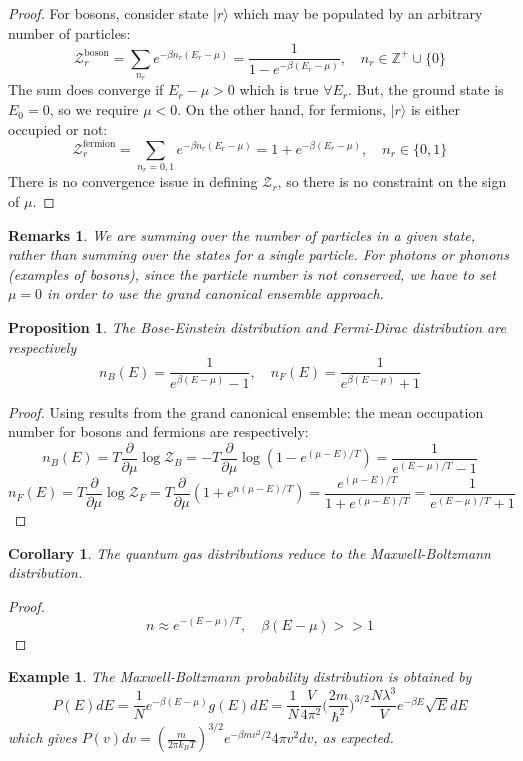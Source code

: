 \documentclass[a4paper]{article}
\newtheorem{eg}{Example}[section]
\newtheorem{remarks}{Remarks}[section]
\theoremstyle{new}
\newtheorem{prop}{Proposition}[section]
\newtheorem{cor}{Corollary}[section]
\begin{document}
\begin{proof}
For bosons, consider state $|r\rangle$ which may be populated by an arbitrary number of particles:
$$\mathcal{Z}^{\text{boson}}_r=\sum_{n_r}e^{-\beta n_r(E_r-\mu)}=\frac{1}{1-e^{-\beta(E_r-\mu)}},\quad n_r\in\mathbb{Z}^+\cup\{0\}$$
The sum does converge if $E_r-\mu>0$ which is true $\forall E_r$. But, the ground state is $E_0=0$, so we require $\mu<0$. On the other hand, for fermions, $|r\rangle$ is either occupied or not:
$$\mathcal{Z}^{\text{fermion}}_r=\sum_{n_r=0,1}e^{-\beta n_r(E_r-\mu)}=1+e^{-\beta(E_r-\mu)},\quad n_r\in\{0,1\}$$
There is no convergence issue in defining $\mathcal{Z}_r$, so there is no constraint on the sign of $\mu$.
\end{proof}
\begin{remarks}
We are summing over the number of particles in a given state, rather than summing over the states for a single particle. For photons or phonons (examples of bosons), since the particle number is not conserved, we have to set $\mu=0$ in order to use the grand canonical ensemble approach.
\end{remarks}
\begin{prop}
The Bose-Einstein distribution and Fermi-Dirac distribution are respectively
$$n_B(E)=\frac{1}{e^{\beta(E-\mu)}-1},\quad n_F(E)=\frac{1}{e^{\beta(E-\mu)}+1}$$
\end{prop}
\begin{proof}
Using results from the grand canonical ensemble: the mean occupation number for bosons and fermions are respectively:
$$n_B(E)=T\frac{\partial}{\partial\mu}\log \mathcal{Z}_B=-T\frac{\partial}{\partial\mu}\log(1-e^{(\mu-E)/T})=\frac{1}{e^{(E-\mu)/T}-1}$$
$$n_F(E)=T\frac{\partial}{\partial\mu}\log\mathcal{Z}_F=T\frac{\partial}{\partial\mu}(1+e^{n(\mu-E)/T})=\frac{e^{(\mu-E)/T}}{1+e^{(\mu-E)/T}}=\frac{1}{e^{(E-\mu)/T}+1}$$
\end{proof}
\begin{cor}
The quantum gas distributions reduce to the Maxwell-Boltzmann distribution.
\end{cor}
\begin{proof}
$$n\approx e^{-(E-\mu)/T},\quad \beta(E-\mu)>>1$$
\end{proof}
\begin{eg}
The Maxwell-Boltzmann probability distribution is obtained by
$$P(E)dE=\frac{1}{N}e^{-\beta(E-\mu)}g(E)dE=\frac{1}{N}\frac{V}{4\pi^2}\bigg(\frac{2m}{\hbar^2}\bigg)^{3/2}\frac{N\lambda^3}{V}e^{-\beta E}\sqrt{E}dE$$
which gives $P(v)dv=(\frac{m}{2\pi k_BT})^{3/2}e^{-\beta mv^2/2}4\pi v^2dv$, as expected.
\end{eg}
\end{document}
